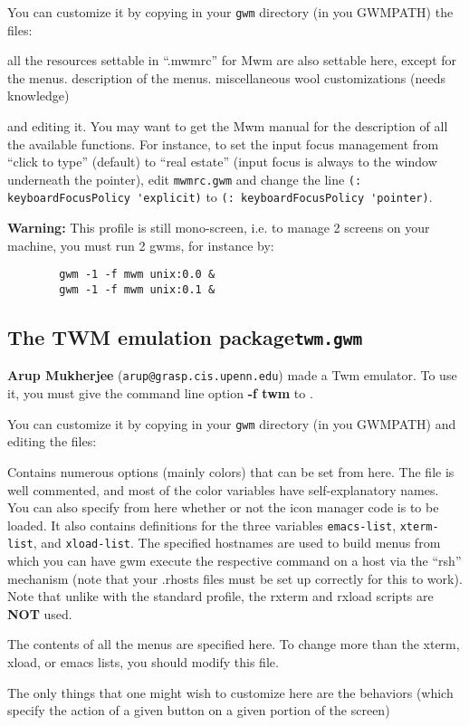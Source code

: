 You can customize it by copying in your
\verb"gwm" directory (in you GWMPATH) the files:

\begin{description}
 all the resources settable in ``.mwmrc'' for {\sc Mwm}
are also settable here, except for the menus.
 description of the menus.
 miscellaneous wool customizations (needs {\WOOL}
knowledge)
\end{description}

and editing it. You may want to get the {\sc Mwm} manual for the description
of all the available functions. For instance, to set the input focus management
from ``click to type'' (default) to ``real estate'' (input focus is always
to the window underneath the pointer), edit \verb"mwmrc.gwm" and change
the line \verb"(: keyboardFocusPolicy 'explicit)" to 
\verb"(: keyboardFocusPolicy 'pointer)".

{\bf Warning:} This profile is still mono-screen, i.e. to manage 2 screens
on your machine, you must run 2 gwms, for instance by:
{\exemplefont\begin{verbatim}
        gwm -1 -f mwm unix:0.0 &
        gwm -1 -f mwm unix:0.1 &
\end{verbatim}}

\subsection{The TWM emulation package\hfill{\tt twm.gwm}}

{\bf Arup Mukherjee} (\verb"arup@grasp.cis.upenn.edu") made a {\sc
Twm} emulator. To use it, you must give the command line 
option {\bf -f twm} to {\GWM}.

You can customize it by copying in your \verb"gwm"
directory (in you GWMPATH) and editing the files:

\begin{description}

 Contains numerous options (mainly colors) that can be
set from here. The file is well commented, and most of the color
variables have self-explanatory names. You can also specify from here
whether or not the icon manager code is to be loaded.
It also contains definitions for the three variables
\verb"emacs-list", \verb"xterm-list", and \verb"xload-list". 
The specified hostnames are
used to build menus from which you can have gwm execute the respective
command on a host via the ``rsh'' mechanism (note that your .rhosts
files must be set up correctly for this to work). Note that unlike
with the standard profile, the rxterm and rxload scripts are {\bf NOT}
used.

 The contents of all the menus are specified
here. To change more than the xterm, xload, or emacs lists, you should
modify this file.

 The only things that one might wish to customize here are the
behaviors (which specify the action of a given button on a given
portion of the screen)
\end{description}

